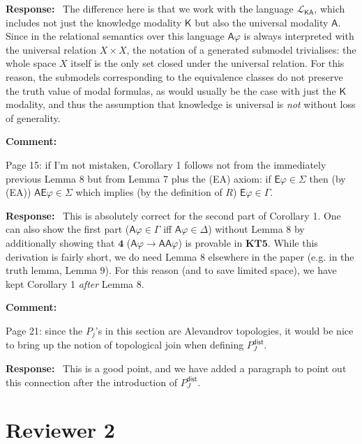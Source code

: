 \documentclass[12pt]{article}
\newenvironment{comment}{
    \noindent\textbf{Comment:}\
    \em
}{\vspace{5mm}}
\newenvironment{response}{
    \noindent\textbf{Response:}\
}{\vspace{5mm}}
\renewcommand{\phi}{\varphi}
\newcommand{\E}{\mathsf{E}}
\newcommand{\A}{\mathsf{A}}
\newcommand{\K}{\mathsf{K}}
\begin{document}
\begin{response}
    The difference here is that we work with the language $\mathcal{L}_{\K\A}$,
    which includes not just the knowledge modality $\K$ but also the universal
    modality $\A$. Since in the relational semantics over this language
    $\A\phi$ is always interpreted with the universal relation $X \times X$,
    the notation of a generated submodel trivialises: the whole space $X$
    itself is the only set closed under the universal relation. For this
    reason, the submodels corresponding to the equivalence classes do not
    preserve the truth value of modal formulas, as would usually be the case
    with just the $\K$ modality, and thus the assumption that knowledge is
    universal is \emph{not} without loss of generality.
\end{response}

\begin{comment}
   Page 15: if I’m not mistaken, Corollary 1 follows not from the immediately
   previous Lemma 8 but from Lemma 7 plus the (EA) axiom: if $\E\phi \in
   \Sigma$ then (by (EA)) $\A\E\phi \in \Sigma$ which implies (by the
   definition of $R$) $\E\phi \in \Gamma$.
\end{comment}

\begin{response}
   This is absolutely correct for the second part of Corollary 1. One can also
   show the first part ($\A\phi \in \Gamma$ iff $\A\phi \in \Delta$) without
   Lemma 8 by additionally showing that $\mathbf{4}$ ($\A\phi \rightarrow
   \A\A\phi$) is provable in $\mathbf{KT5}$. While this derivation is fairly
   short, we do need Lemma 8 elsewhere in the paper (e.g. in the truth lemma,
   Lemma 9). For this reason (and to save limited space), we have kept
   Corollary 1 \emph{after} Lemma 8.
\end{response}

\begin{comment}
    Page 21: since the $P_j$'s in this section are Alevandrov topologies, it
    would be nice to bring up the notion of topological join when defining
    $P^\mathsf{dist}_J$.
\end{comment}

\begin{response}
    This is a good point, and we have added a paragraph to point out this
    connection after the introduction of $P^\mathsf{dist}_J$.
\end{response}

\section*{Reviewer 2}
\end{document}
